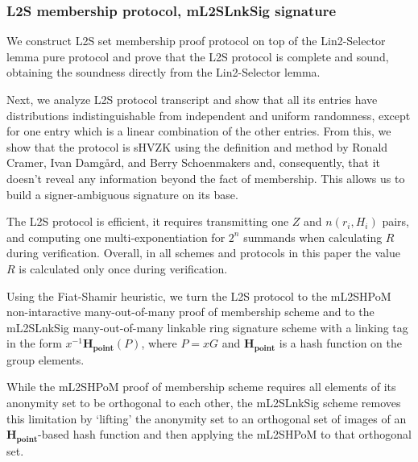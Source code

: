 \documentclass{mathcryptology} %
\theoremstyle{title}
\theoremstyle{titleof}
\begin{document}
\subsubsection{L2S membership protocol, mL2SLnkSig signature}
    We construct L2S set membership proof protocol on top of the Lin2-Selector lemma pure protocol and prove that the L2S protocol is complete and sound, obtaining the soundness directly from the Lin2-Selector lemma.

    Next, we analyze L2S protocol transcript and show that all its entries have distributions indistinguishable from independent and uniform randomness, except for one entry which is a linear combination of the other entries. From this, we show that the protocol is sHVZK using the definition and method by Ronald Cramer, Ivan Damgård, and Berry Schoenmakers \cite{5} and, consequently, that it doesn't reveal any information beyond the fact of membership. This allows us to build a signer-ambiguous signature on its base.

    The L2S protocol is efficient, it requires transmitting one $Z$ and $n \left(r_{i}, H_{i}\right)$ pairs, and computing one multi-exponentiation for $2^{n}$ summands when calculating $R$ during verification. Overall, in all schemes and protocols in this paper the value $R$ is calculated only once during verification.

    Using the Fiat-Shamir heuristic, we turn the L2S protocol to the mL2SHPoM non-intaractive many-out-of-many proof of membership scheme and to the mL2SLnkSig many-out-of-many linkable ring signature scheme with a linking tag in the form $x^{-1}\mathbf{H_{\textbf{point}}} \left(P\right)$, where $P=xG$ and $\mathbf{H_{\textbf{point}}}$ is a hash function on the group elements.

    While the mL2SHPoM proof of membership scheme requires all elements of its anonymity set to be orthogonal to each other, the mL2SLnkSig scheme removes this limitation by `lifting' the anonymity set to an orthogonal set of images of an $\mathbf{H_{\textbf{point}}}$-based hash function and then applying the mL2SHPoM to that orthogonal set.


\end{document}
